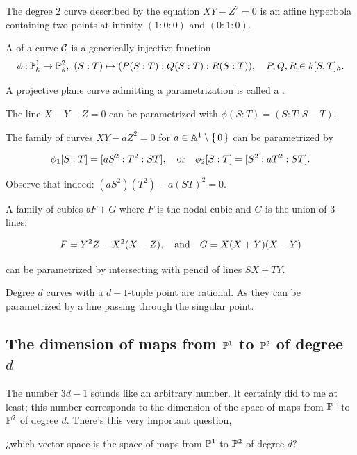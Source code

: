 \documentclass[12pt]{memoir}
\begin{document}
\begin{Ex}
    The degree 2 curve described by the equation \(XY-Z^2=0\) is an affine hyperbola containing two points at infinity \((1:0:0)\) and \((0:1:0)\).
\end{Ex}

\begin{Def}
    A  of a curve \(\mathcal{C}\) is a generically injective function
    \[\phi\:\bP^1_k\to\bP^2_k,\ (S:T)\mapsto(P(S:T):Q(S:T):R(S:T)),\quad P,Q,R\in k[S,T]_h.\]

    A projective plane curve admitting a parametrization is called a .
\end{Def}

\begin{Ex}
    The line \(X-Y-Z=0\) can be parametrized with \(\phi(S:T)=(S:T:S-T)\). 
\end{Ex}

\begin{Ex}
    The family of curves \(XY-aZ^2=0\) for \(a\in\mathbb{A}^1\setminus\{\,0\,\}\) can be parametrized by

    \[\phi_1[S:T]=[aS^2:T^2:ST],\quad\text{or}\quad\phi_2[S:T]=[S^2:aT^2:ST].\]

    Observe that indeed: \((aS^2)(T^2)-a(ST)^2=0\). 
\end{Ex}

\begin{Ex}
    A family of cubics \(bF+G\) where \(F\) is the nodal cubic and \(G\) is the union of \(3\) lines:

    \[F=Y^2Z-X^2(X-Z),\quad\text{and}\quad G=X(X+Y)(X-Y)\]

    can be parametrized by intersecting with pencil of lines \(SX+TY\). 
\end{Ex}

\begin{Ex}
    Degree \(d\) curves with a \(d-1\)-tuple point are rational. As they can be parametrized by a line passing through the singular point.
\end{Ex}

\subsection{The dimension of maps from \(\mathbb{P}^1\) to \(\mathbb{P}^2\) of degree \(d\)}

The number \(3d-1\) sounds like an arbitrary number. It certainly did to me at least; this number corresponds to the dimension of the space of maps from \(\mathbb{P}^1\) to \(\mathbb{P}^2\) of degree \(d\). There's this very important question,
\begin{significant}
    ¿which vector space is the space of maps from \(\mathbb{P}^1\) to \(\mathbb{P}^2\)  of degree \(d\)?
\end{significant}
\end{document}
